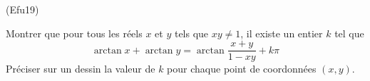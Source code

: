 \begin{tiny}(Efu19)\end{tiny} Montrer que pour tous les réels $x$ et $y$ tels que $xy\neq1$, il existe un entier $k$ tel que
\begin{displaymath}
 \arctan x + \arctan y = \arctan \frac{x+y}{1-xy} + k\pi
\end{displaymath}
Préciser sur un dessin la valeur de $k$ pour chaque point de coordonnées $(x,y)$.